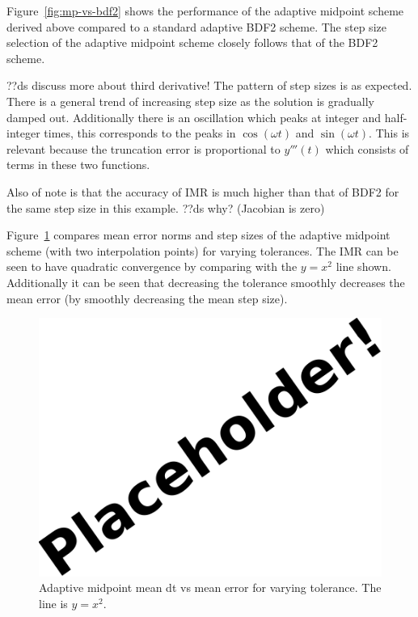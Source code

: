 Figure~\ref{fig:mp-vs-bdf2} shows the performance of the adaptive midpoint scheme derived above compared to a standard adaptive BDF2 scheme.\cite[pg. 715]{Gresho-Sani}
The step size selection of the adaptive midpoint scheme closely follows that of the BDF2 scheme.


??ds discuss more about third derivative!
The pattern of step sizes is as expected.
There is a general trend of increasing step size as the solution is gradually damped out.
Additionally there is an oscillation which peaks at integer and half-integer times, this corresponds to the peaks in $\cos(\omega t)$ and $\sin(\omega t)$.
This is relevant because the truncation error is proportional to $y'''(t)$ which consists of terms in these two functions.

Also of note is that the accuracy of IMR is much higher than that of BDF2 for the same step size in this example.
??ds why? (Jacobian is zero)


Figure~\ref{fig:mp-tols} compares mean error norms and step sizes of the adaptive midpoint scheme (with two interpolation points) for varying tolerances.
The IMR can be seen to have quadratic convergence by comparing with the $y=x^2$ line shown.
Additionally it can be seen that decreasing the tolerance smoothly decreases the mean error (by smoothly decreasing the mean step size).

\begin{figure}[ht!]
  \centering
  \includegraphics{images/placeholder}
  \caption{Adaptive midpoint mean dt vs mean error for varying tolerance. The line is $y = x^2$.}
  \label{fig:mp-tols}
\end{figure}


